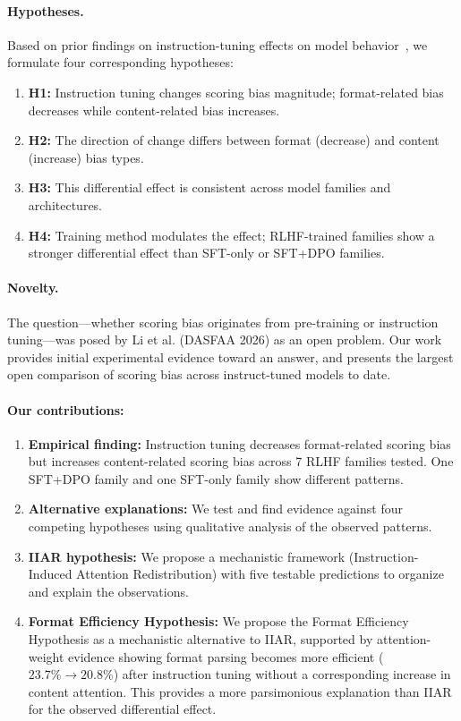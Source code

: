 \documentclass[11pt,twocolumn]{article}
\begin{document}
\paragraph{Hypotheses.} Based on prior findings on instruction-tuning effects on model behavior~\cite{pan2025user,thakur2024judging}, we formulate four corresponding hypotheses:
\begin{enumerate}
    \item \textbf{H1:} Instruction tuning changes scoring bias magnitude; format-related bias decreases while content-related bias increases.
    \item \textbf{H2:} The direction of change differs between format (decrease) and content (increase) bias types.
    \item \textbf{H3:} This differential effect is consistent across model families and architectures.
    \item \textbf{H4:} Training method modulates the effect; RLHF-trained families show a stronger differential effect than SFT-only or SFT+DPO families.
\end{enumerate}

\paragraph{Novelty.} The question---whether scoring bias originates from pre-training or instruction tuning---was posed by Li et al. (DASFAA 2026) as an open problem. Our work provides initial experimental evidence toward an answer, and presents the largest open comparison of scoring bias across instruct-tuned models to date.

\paragraph{Our contributions:}
\begin{enumerate}
    \item \textbf{Empirical finding:} Instruction tuning decreases format-related scoring bias but increases content-related scoring bias across 7 RLHF families tested. One SFT+DPO family and one SFT-only family show different patterns.
    \item \textbf{Alternative explanations:} We test and find evidence against four competing hypotheses using qualitative analysis of the observed patterns.
    \item \textbf{IIAR hypothesis:} We propose a mechanistic framework (Instruction-Induced Attention Redistribution) with five testable predictions to organize and explain the observations.
    \item \textbf{Format Efficiency Hypothesis:} We propose the Format Efficiency Hypothesis as a mechanistic alternative to IIAR, supported by attention-weight evidence showing format parsing becomes more efficient ($23.7\% \to 20.8\%$) after instruction tuning without a corresponding increase in content attention. This provides a more parsimonious explanation than IIAR for the observed differential effect.
\end{enumerate}
\end{document}
